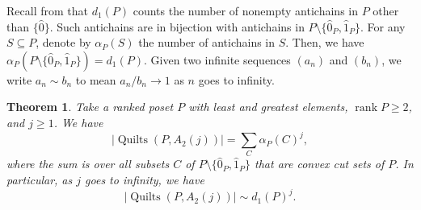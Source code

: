 \documentclass[12pt]{amsart}
\numberwithin{equation}{section}
\newtheorem{theorem}{Theorem}[section]
\theoremstyle{definition}
\newcommand{\quilt}{\operatorname{Quilts}}
\newcommand{\rank}{\operatorname{rank}}
\begin{document}
 
Recall from  that $d_1(P)$ counts the number of nonempty
antichains in $P$ other than $\{\hat 0\}$. Such antichains are in
bijection with antichains in $P \setminus \{\hat 0_P, \hat 1_P\}$.
For any $S \subseteq P$, denote by $\alpha_P(S)$ the number of
antichains in $S$.  Then, we have $\alpha_P(P \setminus \{\hat 0_P,
\hat 1_P\}) = d_1(P)$.  Given two infinite sequences $(a_{n})$ and
$(b_{n})$, we write $a_{n} \sim b_{n}$ to mean $a_{n}/b_{n}
\rightarrow 1$ as $n$ goes to infinity.


\begin{theorem} \label{thm:antichain}
 Take a ranked poset $P$ with least and greatest elements, $\rank P \geq 2$, and $j \geq 1$. We have
 \begin{equation} \label{eq:antichain}
 |\quilt(P,A_2(j))| = \sum_C \alpha_P(C)^j,
 \end{equation}
 where the sum is over all subsets $C$ of $P \setminus \{\hat 0_P,\hat
 1_P\}$ that are convex cut sets of $P$. In particular, as $j$ goes to
 infinity, we have
\begin{equation} \label{eq:antichain2}
|\quilt(P,A_2(j))| \sim  d_1(P)^j.
\end{equation}
\end{theorem}
\end{document}
